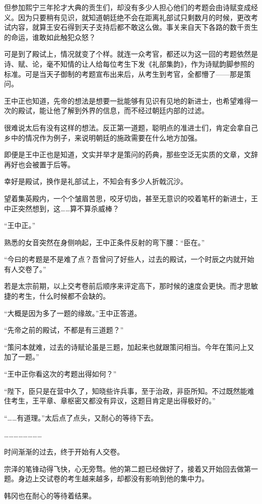 但参加熙宁三年抡才大典的贡生们，却没有多少人担心他们的考题会由诗赋变成经义。因为只要稍有见识，就知道朝廷绝不会在距离礼部试只剩数月的时候，更改考试内容，就算王安石得到天子支持后都不敢这么做。事关来自天下各路的数千贡生的命运，谁敢如此触犯众怒？

可是到了殿试上，情况就变了个样。就连一众考官，都还以为这一回的考题依然是诗、赋、论，毫不知情的让人给每位考生下发《礼部集韵》，作为诗赋韵脚参照的标准。可是当天子御制的考题宣布出来后，从考生到考官，全都懵了——那是策问。

王中正也知道，先帝的想法是想要一批能够有见识有见地的新进士，也希望难得一次的殿试，能让他了解到外界的信息，而不经过朝廷内部的过滤。

很难说太后有没有这样的想法。反正第一道题，聪明点的准进士们，肯定会拿自己乡中的情况作为例子，来说明朝廷的施政需要在什么地方加强。

即便是王中正也是知道，文实并举才是策问的药典，那些空泛无实质的文章，文辞再好也会被置于后等。

幸好是殿试，换作是礼部试上，不知会有多少人折戟沉沙。

望着集英殿内，一个个皱眉苦思，咬牙切齿，甚至无意识的咬着笔杆的新进士，王中正突然想到，这……算不算杀威棒？

“王中正。”

熟悉的女音突然在身侧响起，王中正条件反射的弯下腰：“臣在。”

“今曰的考题是不是难了点？吾曾问了好些人，过去的殿试，一个时辰之内就开始有人交卷了。”

若是太宗前期，以上交考卷前后顺序来评定高下，那时候的速度会更快。而才思敏捷的考生，什么时候都不会缺的。

“大概是因为多了一题的缘故。”王中正答道。

“先帝之前的殿试，不都是有三道题？”

“策问本就难，过去的诗赋论虽是三题，加起来也就跟策问相当。今年在策问上又加了一题。”

“王中正你看这次的考题出得如何？”

“陛下，臣只是在营中久了，知晓些许兵事，至于治政，非臣所知。不过既然能难住考生，王平章、章枢密又都没有异议，这题目肯定是出得极好的。”

“……有道理。”太后点了点头，又耐心的等待下去。

……………………

时间渐渐的过去，终于开始有人交卷。

宗泽的笔锋动得飞快，心无旁骛。他的第二题已经做好了，接着又开始回去做第一题。身边上交试卷的考生越来越多，却都没有影响到他的集中力。

韩冈也在耐心的等待着结果。

